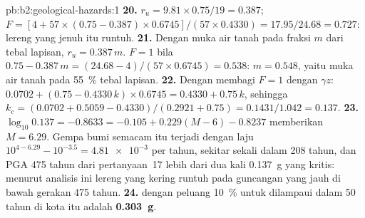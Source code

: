 \begin{solution}{pb:b2:geological-hazards:1}
\textbf{20.} $r_u = 9.81 \times 0.75/19 = 0.387$; $F = [4 + 57 \times (0.75 - 0.387) \times
0.6745]/(57 \times 0.4330) = 17.95/24.68 = 0.727$: lereng yang jenuh itu runtuh.
\textbf{21.} Dengan muka air tanah pada fraksi $m$ dari tebal lapisan, $r_u = 0.387\,m$. $F = 1$ bila
$0.75 - 0.387\,m = (24.68 - 4)/(57 \times 0.6745) = 0.538$: $m = 0.548$, yaitu muka air tanah pada
\qty{55}{\percent} tebal lapisan.
\textbf{22.} Dengan membagi $F = 1$ dengan $\gamma z$: $0.0702 + (0.75 - 0.4330\,k) \times 0.6745 = 0.4330 +
0.75\,k$, sehingga $k_c = (0.0702 + 0.5059 - 0.4330)/(0.2921 + 0.75) = 0.1431/1.042 = 0.137$.
\textbf{23.} $\log_{10} 0.137 = -0.8633 = -0.105 + 0.229(M - 6) - 0.8237$ memberikan $M = 6.29$. Gempa bumi
semacam itu terjadi dengan laju $10^{4 - 6.29} - 10^{-3.5} = \num{4.81e-3}$ per tahun, sekitar sekali dalam 208 tahun,
dan PGA 475 tahun dari pertanyaan~17 lebih dari dua kali \qty{0.137}{g} yang kritis: menurut
analisis ini lereng yang kering runtuh pada guncangan yang jauh di bawah gerakan 475 tahun.
\textbf{24.}  dengan peluang \qty{10}{\percent} untuk dilampaui dalam 50
tahun di kota itu adalah \textbf{\qty[text-series-to-math=true]{0.303}{g}}.
\end{solution}
